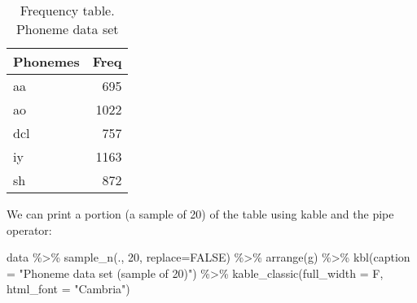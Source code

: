 \documentclass[
]{article}
\newenvironment{Shaded}{\begin{snugshade}}{\end{snugshade}}
\newcommand{\AttributeTok}[1]{\textcolor[rgb]{0.77,0.63,0.00}{#1}}
\newcommand{\ConstantTok}[1]{\textcolor[rgb]{0.00,0.00,0.00}{#1}}
\newcommand{\DecValTok}[1]{\textcolor[rgb]{0.00,0.00,0.81}{#1}}
\newcommand{\FunctionTok}[1]{\textcolor[rgb]{0.00,0.00,0.00}{#1}}
\newcommand{\NormalTok}[1]{#1}
\newcommand{\SpecialCharTok}[1]{\textcolor[rgb]{0.00,0.00,0.00}{#1}}
\newcommand{\StringTok}[1]{\textcolor[rgb]{0.31,0.60,0.02}{#1}}
\begin{document}
\begin{table}

\caption{\label{tab:unnamed-chunk-10}Frequency table. Phoneme data set}
\centering
\begin{tabular}[t]{l|r}
\hline
Phonemes & Freq\\
\hline
aa & 695\\
\hline
ao & 1022\\
\hline
dcl & 757\\
\hline
iy & 1163\\
\hline
sh & 872\\
\hline
\end{tabular}
\end{table}

We can print a portion (a sample of 20) of the table using kable and the
pipe operator:

\begin{Shaded}
\begin{Highlighting}[]
\NormalTok{data }\SpecialCharTok{\%\textgreater{}\%}
  \FunctionTok{sample\_n}\NormalTok{(., }\DecValTok{20}\NormalTok{, }\AttributeTok{replace=}\ConstantTok{FALSE}\NormalTok{) }\SpecialCharTok{\%\textgreater{}\%} 
  \FunctionTok{arrange}\NormalTok{(g) }\SpecialCharTok{\%\textgreater{}\%} 
  \FunctionTok{kbl}\NormalTok{(}\AttributeTok{caption =} \StringTok{"Phoneme data set (sample of 20)"}\NormalTok{) }\SpecialCharTok{\%\textgreater{}\%}
  \FunctionTok{kable\_classic}\NormalTok{(}\AttributeTok{full\_width =}\NormalTok{ F, }\AttributeTok{html\_font =} \StringTok{"Cambria"}\NormalTok{)}
\end{Highlighting}
\end{Shaded}
\end{document}
